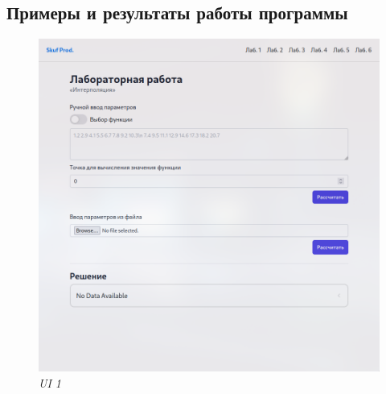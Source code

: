\documentclass{article}
\begin{document}
            \subsection{Примеры и результаты работы программы}
                  \begin{figure}[H] 
                        \begin{center}  
                              \includegraphics[scale=0.4]{ui1.png}
                              \caption{\small \sl {UI  1}}  
                        \end{center}  
                  \end{figure}
\end{document}
